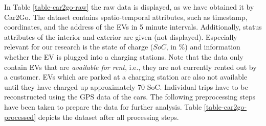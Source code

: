 \documentclass[a4paper, 12pt]{article}
\begin{document}
In Table \ref{table-car2go-raw} the raw data is displayed, as we have obtained it
by Car2Go. The dataset contains spatio-temporal attributes, such as timestamp,
coordinates, and the address of the EVs in 5 minute intervals. Additionally,
status attributes of the interior and exterior are given (not displayed).
Especially relevant for our research is the state of charge (\(SoC\), in \%) and
information whether the EV is plugged into a charging stations. Note that the
data only contain EVs that are \emph{available for rent}, i.e., they are not
currently rented out by a customer. EVs which are parked at a charging station
are also not available until they have charged up approximately 70 SoC.
Individual trips have to be reconstructed using the GPS data of the cars. The
following preprocessing steps have been taken to prepare the data for further
analysis. Table \ref{table-car2go-processed} depicts the dataset after all
processing steps.
\end{document}

